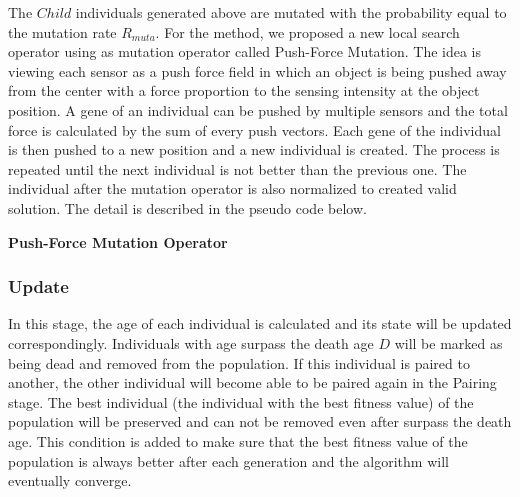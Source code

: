 \documentclass[final]{elsarticle}
\begin{document}
The $Child$ individuals generated above are mutated with the probability equal to the mutation rate $R_{muta}$. For the method, we proposed a new local search operator using as mutation operator called Push-Force Mutation. The idea is viewing each sensor as a push force field in which an object is being pushed away from the center with a force proportion to the sensing intensity at the object position. A gene of an individual can be pushed by multiple sensors and the total force is calculated by the sum of every push vectors. Each gene of the individual is then pushed to a new position and a new individual is created. The process is repeated until the next individual is not better than the previous one. The individual after the mutation operator is also normalized to created valid solution. The detail is described in the pseudo code below.
\begin{algorithm}[H]
	\SetAlgoLined
	\caption{\textbf{Push-Force Mutation Operator}} 
	\label{alg.3}
\end{algorithm} 

\subsubsection{Update}

In this stage, the age of each individual is calculated and its state will be updated correspondingly. Individuals with age surpass the death age $D$ will be marked as being dead and removed from the population. If this individual is paired to another, the other individual will become able to be paired again in the Pairing stage. The best individual (the individual with the best fitness value) of the population will be preserved and can not be removed even after surpass the death age. This condition is added to make sure that the best fitness value of the population is always better after each generation and the algorithm will eventually converge.
\end{document}
